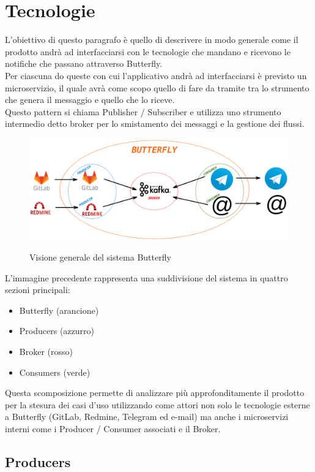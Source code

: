 \newpage
\section{Tecnologie}
	L'obiettivo di questo paragrafo è quello di descrivere in modo generale come il prodotto andrà ad interfacciarsi con le tecnologie che mandano e ricevono le notifiche che passano attraverso Butterfly.\\
	Per ciascuna do queste con cui l'applicativo andrà ad interfacciarsi è previsto un microservizio, il quale avrà come scopo quello di fare da tramite tra lo strumento che genera il messaggio e quello che lo riceve.\\
	Questo pattern si chiama Publisher / Subscriber e utilizza uno strumento intermedio detto broker per lo smistamento dei messaggi e la gestione dei flussi.

	\begin{figure}[H]
		\centering
		\includegraphics[width=\textwidth]{img/butterfly.png}\\
		\caption{Visione generale del sistema Butterfly}
	\end{figure}
	L'immagine precedente rappresenta una suddivisione del sistema in quattro sezioni principali:
	\begin{itemize}
		\item Butterfly (arancione)
		\item Producers (azzurro)
		\item Broker (rosso)
		\item Consumers (verde)
	\end{itemize}
	Questa scomposizione permette di analizzare più approfonditamente il prodotto per la stesura dei casi d'uso utilizzando come attori non solo le tecnologie esterne a Butterfly (GitLab, Redmine, Telegram ed e-mail) ma anche i microservizi interni come i Producer / Consumer associati e il Broker.
	
	\subsection{Producers}
	
